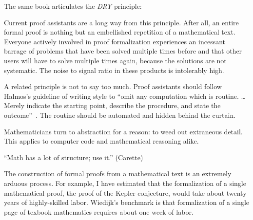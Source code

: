 \documentclass{llncs}
\newcommand{\ring}[1]{\mathbb{#1}}
\begin{document}
  The same book articulates the {\it DRY} principle:

Current proof assistants are a long way from this principle.  After
all, an entire formal proof is nothing but an embellished repetition
of a mathematical text.  Everyone actively involved in proof
formalization experiences an incessant barrage of problems that have
been solved multiple times before and that other users will have to
solve multiple times again, because the solutions are not systematic.
The noise to signal ratio in these products is intolerably high.


A related principle is not to say too much.  
Proof assistants should follow Halmos's guideline of writing style to ``omit
any computation which is routine. \dots Merely indicate the starting point,
describe the procedure, and state the outcome''~\cite{Halmos}.  The routine
should be automated and hidden behind the curtain.


Mathematicians  turn to abstraction for a reason: to weed out
extraneous detail.  This applies to computer code and mathematical
reasoning alike.

``Math has a lot of structure; use it.'' (Carette)


The construction of formal proofs from a mathematical text is an extremely
arduous process.  For example, I have estimated that the formalization of a single
mathematical proof, the proof of the Kepler conjecture, would take about twenty
years of highly-skilled labor.  Wiedijk's benchmark is that formalization
of a single page of texbook mathematics requires about one week of labor.
\end{document}
